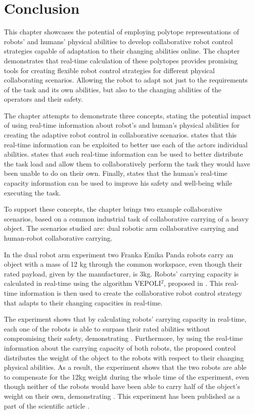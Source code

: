\section{Conclusion}

This chapter showcases the potential of employing polytope representations of robots' and humans' physical abilities to develop collaborative robot control strategies capable of adaptation to their changing abilities online. The chapter demonstrates that real-time calculation of these polytopes provides promising tools for creating flexible robot control strategies for different physical collaborating scenarios. Allowing the robot to adapt not just to the requirements of the task and its own abilities, but also to the changing abilities of the operators and their safety.

The chapter attempts to demonstrate three concepts, stating the potential impact of using real-time information about robot's and human's physical abilities for creating the adaptive robot control in collaborative scenarios.  states that this real-time information can be exploited to better use each of the actors individual abilities. 
 states that such real-time information can be used to better distribute the task load and allow them to collaboratively perform the task they would have been unable to do on their own. Finally,  states that the human's real-time capacity information can be used to improve his safety and well-being while executing the task.

To support these concepts, the chapter brings two example collaborative scenarios, based on a common industrial task of collaborative carrying of a heavy object. The scenarios studied are: dual robotic arm collaborative carrying and human-robot collaborative carrying. 

In the dual robot arm experiment two Franka Emika Panda robots carry an object with a mass of 12 kg through the common workspace, even though their rated payload, given by the manufacturer, is 3kg. 
Robots' carrying capacity is calculated in real-time using the algorithm VEPOLI$^2$, proposed in . This real-time information is then used to create the collaborative robot control strategy that adapts to their changing capacities in real-time.

The experiment shows that by calculating robots' carrying capacity in real-time, each one of the robots is able to surpass their rated abilities without compromising their safety, demonstrating .
Furthermore, by using the real-time information about the carrying capacity of both robots, the proposed control distributes the weight of the object to the robots with respect to their changing physical abilities. As a result, the experiment shows that the two robots are able to compensate for the 12kg weight during the whole time of the experiment, even though neither of the robots would have been able to carry half of the object's weight on their own, demonstrating . This experiment has been published as a part of the scientific article \citet{skuric2021robot}.

